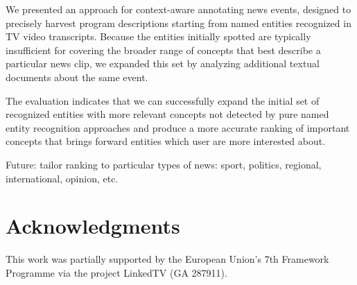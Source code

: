 \documentclass{llncs}
\begin{document}
We presented an approach for context-aware annotating news events, designed to precisely harvest program descriptions starting from named entities recognized in TV video transcripts. Because the entities initially spotted are typically insufficient for covering the broader range of concepts that best describe a particular news clip, we expanded this set by analyzing additional textual documents about the same event.

The evaluation indicates that we can successfully expand the initial set of recognized entities with more relevant concepts not detected by pure named entity recognition approaches and produce a more accurate ranking of important concepts that brings forward entities which user are more interested about.

Future: tailor ranking to particular types of news: sport, politics, regional, international, opinion, etc.


\section*{Acknowledgments}
This work was partially supported by the European Union's 7th Framework Programme via the project LinkedTV (GA 287911).



\end{document}
